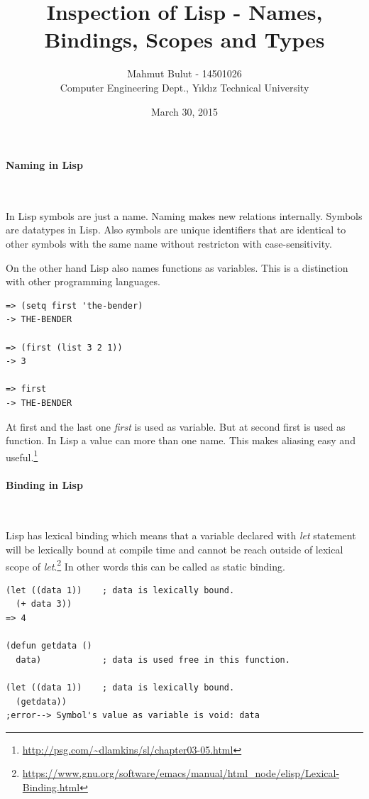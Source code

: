 \documentclass[11pt]{article}
\begin{document}
\title{ Inspection of Lisp - Names, Bindings, Scopes and Types }
\date{March 30, 2015}
\author{Mahmut Bulut - 14501026\\ Computer Engineering Dept., Yıldız Technical University}

\maketitle
\paragraph{Naming in Lisp} ~\\

\par
In Lisp symbols are just a name. Naming makes new relations internally. Symbols are  datatypes in Lisp. Also symbols are unique identifiers that are identical to other symbols with the same name without restricton with case-sensitivity.
\par
On the other hand Lisp also names functions as variables. This is a distinction with other programming languages.
\begin{lstlisting}
=> (setq first 'the-bender)
-> THE-BENDER

=> (first (list 3 2 1))
-> 3

=> first
-> THE-BENDER
\end{lstlisting}
At first and the last one \textit{first} is used as variable. But at second first is used as function.
In Lisp a value can more than one name. This makes aliasing easy and useful.\footnote{\url{http://psg.com/~dlamkins/sl/chapter03-05.html}}

\paragraph{Binding in Lisp} ~\\

\par
Lisp has lexical binding which means that a variable declared with \textit{let} statement will be lexically bound at compile time and cannot be reach outside of lexical scope of \textit{let}.\footnote{\url{https://www.gnu.org/software/emacs/manual/html_node/elisp/Lexical-Binding.html}} In other words this can be called as static binding.

\begin{lstlisting}
(let ((data 1))    ; data is lexically bound.
  (+ data 3))
=> 4

(defun getdata ()
  data)            ; data is used free in this function.

(let ((data 1))    ; data is lexically bound.
  (getdata))
;error--> Symbol's value as variable is void: data
\end{lstlisting}
\end{document}
